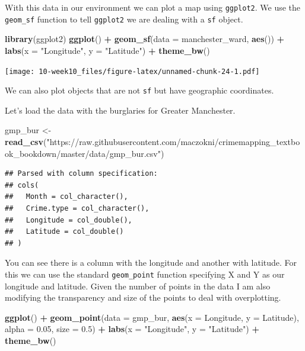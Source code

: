 \documentclass[]{book}
\newenvironment{Shaded}{\begin{snugshade}}{\end{snugshade}}
\newcommand{\DataTypeTok}[1]{\textcolor[rgb]{0.13,0.29,0.53}{#1}}
\newcommand{\FloatTok}[1]{\textcolor[rgb]{0.00,0.00,0.81}{#1}}
\newcommand{\KeywordTok}[1]{\textcolor[rgb]{0.13,0.29,0.53}{\textbf{#1}}}
\newcommand{\NormalTok}[1]{#1}
\newcommand{\OperatorTok}[1]{\textcolor[rgb]{0.81,0.36,0.00}{\textbf{#1}}}
\newcommand{\StringTok}[1]{\textcolor[rgb]{0.31,0.60,0.02}{#1}}
\begin{document}
With this data in our environment we can plot a map using \texttt{ggplot2}. We use the \texttt{geom\_sf} function to tell \texttt{ggplot2} we are dealing with a \texttt{sf} object.

\begin{Shaded}
\begin{Highlighting}[]
\KeywordTok{library}\NormalTok{(ggplot2)}
\KeywordTok{ggplot}\NormalTok{() }\OperatorTok{+}\StringTok{ }\KeywordTok{geom_sf}\NormalTok{(}\DataTypeTok{data =}\NormalTok{ manchester_ward, }\KeywordTok{aes}\NormalTok{()) }\OperatorTok{+}
\StringTok{  }\KeywordTok{labs}\NormalTok{(}\DataTypeTok{x =} \StringTok{"Longitude"}\NormalTok{, }\DataTypeTok{y =} \StringTok{"Latitude"}\NormalTok{) }\OperatorTok{+}
\StringTok{  }\KeywordTok{theme_bw}\NormalTok{()}
\end{Highlighting}
\end{Shaded}

\texttt{[image: 10-week10\_files/figure-latex/unnamed-chunk-24-1.pdf]}

We can also plot objects that are not \texttt{sf} but have geographic coordinates.

Let's load the data with the burglaries for Greater Manchester.

\begin{Shaded}
\begin{Highlighting}[]
\NormalTok{gmp_bur <-}\StringTok{ }\KeywordTok{read_csv}\NormalTok{(}\StringTok{"https://raw.githubusercontent.com/maczokni/crimemapping_textbook_bookdown/master/data/gmp_bur.csv"}\NormalTok{)}
\end{Highlighting}
\end{Shaded}

\begin{verbatim}
## Parsed with column specification:
## cols(
##   Month = col_character(),
##   Crime.type = col_character(),
##   Longitude = col_double(),
##   Latitude = col_double()
## )
\end{verbatim}

You can see there is a column with the longitude and another with latitude. For this we can use the standard \texttt{geom\_point} function specifying X and Y as our longitude and latitude. Given the number of points in the data I am also modifying the transparency and size of the points to deal with overplotting.

\begin{Shaded}
\begin{Highlighting}[]
\KeywordTok{ggplot}\NormalTok{() }\OperatorTok{+}\StringTok{ }
\StringTok{  }\KeywordTok{geom_point}\NormalTok{(}\DataTypeTok{data =}\NormalTok{ gmp_bur, }\KeywordTok{aes}\NormalTok{(}\DataTypeTok{x =}\NormalTok{ Longitude, }\DataTypeTok{y =}\NormalTok{ Latitude), }
             \DataTypeTok{alpha =} \FloatTok{0.05}\NormalTok{, }\DataTypeTok{size =} \FloatTok{0.5}\NormalTok{) }\OperatorTok{+}\StringTok{ }
\StringTok{  }\KeywordTok{labs}\NormalTok{(}\DataTypeTok{x =} \StringTok{"Longitude"}\NormalTok{, }\DataTypeTok{y =} \StringTok{"Latitude"}\NormalTok{) }\OperatorTok{+}
\StringTok{  }\KeywordTok{theme_bw}\NormalTok{()}
\end{Highlighting}
\end{Shaded}
\end{document}
